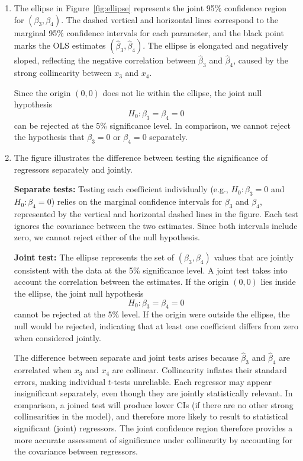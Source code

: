 \begin{enumerate}[label=(\roman*)]
\item
The ellipse in Figure~\ref{fig:ellipse} represents the joint 95\% confidence region for $(\beta_3, \beta_4)$.  
The dashed vertical and horizontal lines correspond to the marginal 95\% confidence intervals for each parameter, and the black point marks the OLS estimates $(\hat{\beta}_3, \hat{\beta}_4)$.  
The ellipse is elongated and negatively sloped, reflecting the negative correlation between $\hat{\beta}_3$ and $\hat{\beta}_4$, caused by the strong collinearity between $x_3$ and $x_4$.  

\medskip
\noindent

Since the origin $(0, 0)$ does not lie within the ellipse, the joint null hypothesis
\[
H_0 : \beta_3 = \beta_4 = 0
\]
can be rejected at the 5\% significance level. In comparison, we cannot reject the hypothesis that $\beta_3 = 0$ or $\beta_4=0$ separately. 


\item 
The figure illustrates the difference between testing the significance of regressors separately and jointly.  

\medskip
\noindent
\textbf{Separate tests:}  
Testing each coefficient individually (e.g., $H_0 : \beta_3 = 0$ and $H_0 : \beta_4 = 0$) relies on the marginal confidence intervals for $\beta_3$ and $\beta_4$, represented by the vertical and horizontal dashed lines in the figure. Each test ignores the covariance between the two estimates. Since both intervals include zero, we cannot reject either of the null hypothesis. 

\medskip
\noindent
\textbf{Joint test:}  
The ellipse represents the set of $(\beta_3, \beta_4)$ values that are jointly consistent with the data at the 5\% significance level.  
A joint test takes into account the correlation between the estimates.  
If the origin $(0,0)$ lies inside the ellipse, the joint null hypothesis
\[
H_0 : \beta_3 = \beta_4 = 0
\]
cannot be rejected at the 5\% level.  
If the origin were outside the ellipse, the null would be rejected, indicating that at least one coefficient differs from zero when considered jointly.

\medskip
\noindent
The difference between separate and joint tests arises because $\hat{\beta}_3$ and $\hat{\beta}_4$ are correlated when $x_3$ and $x_4$ are collinear.  
Collinearity inflates their standard errors, making individual $t$-tests unreliable. Each regressor may appear insignificant separately, even though they are jointly statistically relevant. In comparison, a joined test will produce lower CIs (if there are no other strong collinearities in the model), and therefore more likely to result to statistical significant (joint) regressors. The joint confidence region therefore provides a more accurate assessment of significance under collinearity by accounting for the covariance between regressors.
\end{enumerate}